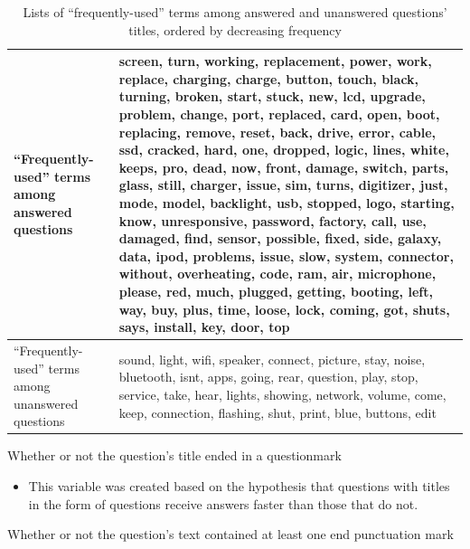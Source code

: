 \documentclass{article}
\begin{document}
\begin{table}[!htbp]
\centering
\caption{Lists of ``frequently-used'' terms among answered and unanswered questions' titles, ordered by decreasing frequency}
\begin{tabular}{|p{4cm}|p{8cm}|}
  \hline
 ``Frequently-used'' terms among answered questions & screen, turn, working, replacement, power, work, replace, charging, charge, button, touch, black, turning, broken, start, stuck, new, lcd, upgrade, problem, change, port, replaced, card, open, boot, replacing, remove, reset, back, drive, error, cable, ssd, cracked, hard, one, dropped, logic, lines, white, keeps, pro, dead, now, front, damage, switch, parts, glass, still, charger, issue, sim, turns, digitizer, just, mode, model, backlight, usb, stopped, logo, starting, know, unresponsive, password, factory, call, use, damaged, find, sensor, possible, fixed, side, galaxy, data, ipod, problems, issue, slow, system, connector, without, overheating, code, ram, air, microphone, please, red, much, plugged, getting, booting, left, way, buy, plus, time, loose, lock, coming, got, shuts, says, install, key, door, top \\
  \hline
  ``Frequently-used'' terms among unanswered questions & sound, light, wifi, speaker, connect, picture, stay, noise, bluetooth, isnt, apps, going, rear, question, play, stop, service, take, hear, lights, showing, network, volume, come, keep, connection, flashing, shut, print, blue, buttons, edit \\ 
   \hline
\end{tabular}
\label{table:frequent_terms}
\end{table}


Whether or not the question's title ended in a questionmark

\begin{itemize}
  \item This variable was created based on the hypothesis that questions with titles in the form of questions receive answers faster than those that do not.
\end{itemize}


Whether or not the question's text contained at least one end punctuation mark
\end{document}
